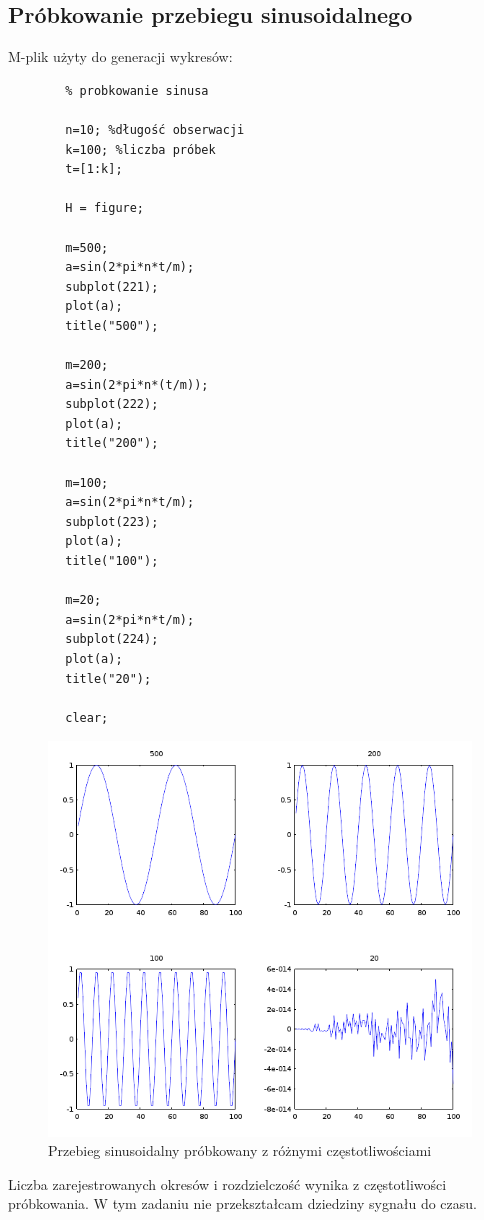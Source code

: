 \documentclass[12pt,titlepage]{report}
\begin{document}
\subsection{Próbkowanie przebiegu sinusoidalnego}
M-plik użyty do generacji wykresów:
\begin{multicols}{3}
	{
		\tiny
		\begin{verbatim}
		% probkowanie sinusa
		
		n=10; %długość obserwacji
		k=100; %liczba próbek
		t=[1:k];
		
		H = figure;
		
		m=500;
		a=sin(2*pi*n*t/m);
		subplot(221);
		plot(a);
		title("500");
		
		m=200;
		a=sin(2*pi*n*(t/m));
		subplot(222);
		plot(a);
		title("200");
		
		m=100;
		a=sin(2*pi*n*t/m);
		subplot(223);
		plot(a);
		title("100");
		
		m=20;
		a=sin(2*pi*n*t/m);
		subplot(224);
		plot(a);
		title("20");
		
		clear;
		\end{verbatim}
	}
\end{multicols}
\begin{figure}[!h]
	\centering
	\includegraphics[scale=0.7]{../cw03_output}
	\caption{Przebieg sinusoidalny próbkowany z różnymi częstotliwościami}
\end{figure}
Liczba zarejestrowanych okresów i rozdzielczość wynika z częstotliwości próbkowania. W tym zadaniu nie przekształcam dziedziny sygnału do czasu.
\newpage
\end{document}
